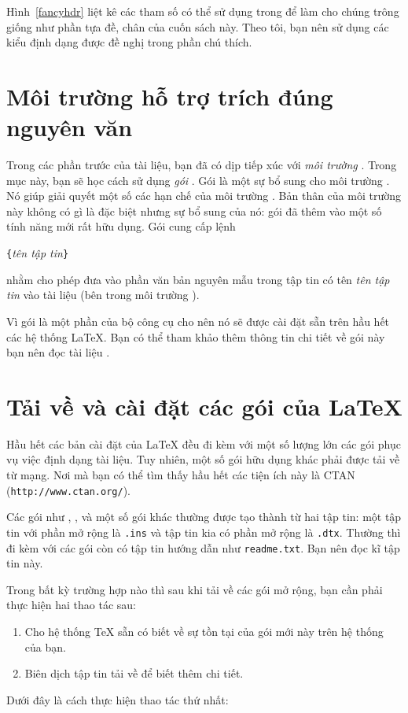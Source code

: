 Hình~\ref{fancyhdr} liệt kê các tham số có thể sử dụng trong  để làm cho chúng trông giống như phần tựa đề, chân của cuốn sách này. Theo tôi, bạn nên sử dụng các kiểu định dạng được đề nghị trong phần chú thích.

\section{Môi trường hỗ trợ trích đúng nguyên văn}
Trong các phần trước của tài liệu, bạn đã có dịp tiếp xúc với \emph{môi trường} . Trong mục này, bạn sẽ học cách sử dụng \emph{gói} . Gói  là một sự bổ sung cho môi trường . Nó giúp giải quyết một số các hạn chế của môi trường . Bản thân của môi trường này không có gì là đặc biệt nhưng sự bổ sung của nó: gói  đã thêm vào một số tính năng mới rất hữu dụng. Gói  cung cấp lệnh

\begin{lscommand}
\verb|{|\emph{tên tập tin}\verb|}|
\end{lscommand}
\noindent nhằm cho phép đưa vào phần văn bản nguyên mẫu trong tập tin có tên \emph{tên tập tin} vào tài liệu (bên trong môi trường ).

Vì gói  là một phần của bộ công cụ cho nên nó sẽ được cài đặt sẵn trên hầu hết các hệ thống \LaTeX{}. Bạn có thể tham khảo thêm thông tin chi tiết về gói này bạn nên đọc tài liệu \cite{verbatim}.


\section{Tải về và cài đặt các gói của \LaTeX{}}
Hầu hết các bản cài đặt của \LaTeX{} đều đi kèm với một số lượng lớn các gói phục vụ việc định dạng tài liệu. Tuy nhiên, một số gói hữu dụng khác phải được tải về từ mạng. Nơi mà bạn có thể tìm thấy hầu hết các tiện ích này là CTAN (\verb|http://www.ctan.org/|).

Các gói như , , và một số gói khác thường được tạo thành từ hai tập tin: một tập tin với phần mở rộng là \texttt{.ins} và tập tin kia có phần mở rộng là \texttt{.dtx}. Thường thì đi kèm với các gói còn có tập tin hướng dẫn như \texttt{readme.txt}. Bạn nên đọc kĩ tập tin này.

Trong bất kỳ trường hợp nào thì sau khi tải về các gói mở rộng, bạn cần phải thực hiện hai thao tác sau:
\begin{enumerate}
\item Cho hệ thống \TeX{} sẵn có biết về sự tồn tại của gói mới này trên hệ thống của bạn.
\item Biên dịch tập tin tải về để biết thêm chi tiết.
\end{enumerate}
Dưới đây là cách thực hiện thao tác thứ nhất:

